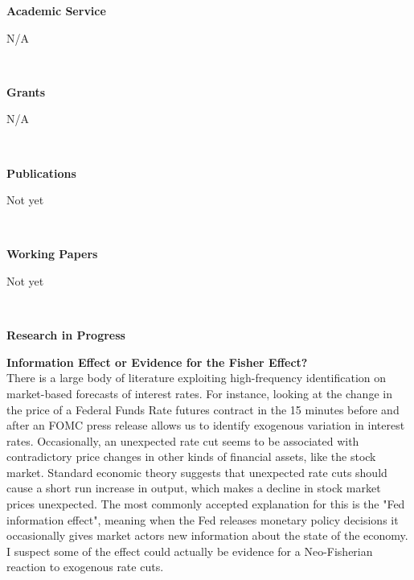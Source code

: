 \documentclass[final]{article}
\begin{document}
	\begin{minipage}[t]{.20\textwidth}
		\Large{\textbf{Academic Service }}\\
	\end{minipage}
	\begin{minipage}[t]{.80\textwidth}
		\hfil N/A
	\end{minipage}\\

	\begin{minipage}[t]{.20\textwidth}
		\Large{\textbf{Grants}}\\
	\end{minipage}
	\begin{minipage}[t]{.80\textwidth}
		\hfil N/A
	\end{minipage}\\
	\begin{minipage}[t]{.20\textwidth}
		\Large{\textbf{Publications}}\\
	\end{minipage}
	\begin{minipage}[t]{.80\textwidth}
		 Not yet
	\end{minipage}\\
	\begin{minipage}[t]{.20\textwidth}
		\Large{\textbf{Working \mbox{Papers}}}\\
	\end{minipage}
	\begin{minipage}[t]{.80\textwidth}
		\hfil Not yet
	\end{minipage}\\
	\begin{minipage}[t]{.20\textwidth}
		\Large{\textbf{Research in Progress}}\\
	\end{minipage}
	\begin{minipage}[t]{.80\textwidth}
		\textbf{Information Effect or Evidence for the Fisher Effect?} \\
		There is a large body of literature exploiting high-frequency identification on market-based forecasts of interest rates. For instance, looking at the change in the price of a Federal Funds Rate futures contract in the 15 minutes before and after an FOMC press release allows us to identify exogenous variation in interest rates. Occasionally, an unexpected rate cut seems to be associated with contradictory price changes in other kinds of financial assets, like the stock market. Standard economic theory suggests that unexpected rate cuts should cause a short run increase in output, which makes a decline in stock market prices unexpected. The most commonly accepted explanation for this is the "Fed information effect", meaning when the Fed releases monetary policy decisions it occasionally gives market actors new information about the state of the economy. I suspect some of the effect could actually be evidence for a Neo-Fisherian reaction to exogenous rate cuts. 
	\end{minipage}
\end{document}
